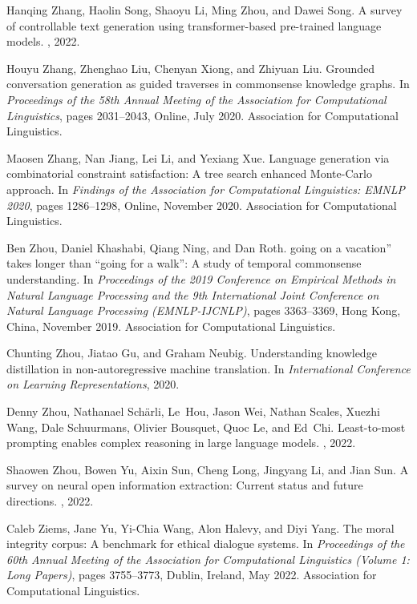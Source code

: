 \documentclass[11pt]{article}
\begin{document}
\begin{thebibliography}{100}
Hanqing Zhang, Haolin Song, Shaoyu Li, Ming Zhou, and Dawei Song.
\newblock A survey of controllable text generation using transformer-based
  pre-trained language models.
, 2022.

Houyu Zhang, Zhenghao Liu, Chenyan Xiong, and Zhiyuan Liu.
\newblock Grounded conversation generation as guided traverses in commonsense
  knowledge graphs.
\newblock In {\em Proceedings of the 58th Annual Meeting of the Association for
  Computational Linguistics}, pages 2031--2043, Online, July 2020. Association
  for Computational Linguistics.

Maosen Zhang, Nan Jiang, Lei Li, and Yexiang Xue.
\newblock Language generation via combinatorial constraint satisfaction: A tree
  search enhanced {M}onte-{C}arlo approach.
\newblock In {\em Findings of the Association for Computational Linguistics:
  EMNLP 2020}, pages 1286--1298, Online, November 2020. Association for
  Computational Linguistics.

Ben Zhou, Daniel Khashabi, Qiang Ning, and Dan Roth.
going on a vacation{''} takes longer than {``}going for a
  walk{''}: A study of temporal commonsense understanding.
\newblock In {\em Proceedings of the 2019 Conference on Empirical Methods in
  Natural Language Processing and the 9th International Joint Conference on
  Natural Language Processing (EMNLP-IJCNLP)}, pages 3363--3369, Hong Kong,
  China, November 2019. Association for Computational Linguistics.

Chunting Zhou, Jiatao Gu, and Graham Neubig.
\newblock Understanding knowledge distillation in non-autoregressive machine
  translation.
\newblock In {\em International Conference on Learning Representations}, 2020.

Denny Zhou, Nathanael Sch{\"a}rli, Le~Hou, Jason Wei, Nathan Scales, Xuezhi
  Wang, Dale Schuurmans, Olivier Bousquet, Quoc Le, and Ed~Chi.
\newblock Least-to-most prompting enables complex reasoning in large language
  models.
, 2022.

Shaowen Zhou, Bowen Yu, Aixin Sun, Cheng Long, Jingyang Li, and Jian Sun.
\newblock A survey on neural open information extraction: Current status and
  future directions.
, 2022.

Caleb Ziems, Jane Yu, Yi-Chia Wang, Alon Halevy, and Diyi Yang.
\newblock The moral integrity corpus: A benchmark for ethical dialogue systems.
\newblock In {\em Proceedings of the 60th Annual Meeting of the Association for
  Computational Linguistics (Volume 1: Long Papers)}, pages 3755--3773, Dublin,
  Ireland, May 2022. Association for Computational Linguistics.

\end{thebibliography}
\end{document}
